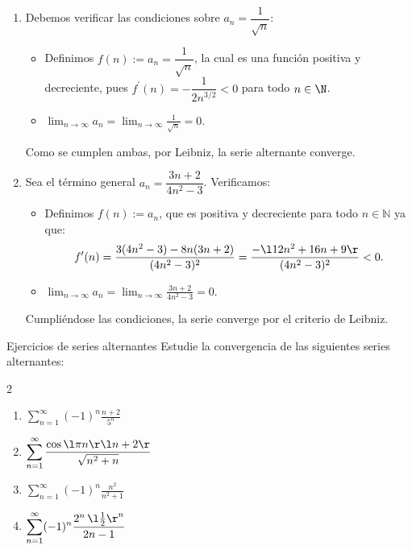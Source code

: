 \begin{soln}
    $\left. \right.$
    \begin{enumerate}
        \item Debemos verificar las condiciones sobre $a_n = \dfrac{1}{\sqrt{n}}$:
        \begin{itemize}
            \item Definimos $f(n) := a_n = \dfrac{1}{\sqrt{n}}$, la cual es una función positiva y decreciente, pues $f^{\prime}(n) = -\dfrac{1}{2n^{3/2}} < 0$ para todo $n \in \N$.
            \item $\displaystyle \lim_{n \to \infty} a_n = \displaystyle \lim_{n \to \infty} \frac{1}{\sqrt{n}} = 0$.
        \end{itemize}
        Como se cumplen ambas, por Leibniz, la serie alternante converge.
        
        \item Sea el término general $a_n = \dfrac{3n+2}{4n^2-3}$. Verificamos:
        \begin{itemize}
            \item Definimos $f(n) := a_n$, que es positiva y decreciente para todo $n\in\mathbb{N}$ ya que:
            \[ f^{\prime}(n) = \dfrac{3 (4n^2 -3) - 8n(3n+2)}{(4n^2-3)^2} = \dfrac{- \l 12n^2+16n+9 \r}{(4n^2-3)^2} < 0. \]
            \item $\displaystyle \lim_{n \to \infty} a_n = \displaystyle \lim_{n \to \infty} \frac{3n+2}{4n^2-3} = 0$.
        \end{itemize}
        Cumpliéndose las condiciones, la serie converge por el criterio de Leibniz.
    \end{enumerate}
\end{soln}

\begin{problem}{Ejercicios de series alternantes}{}
    Estudie la convergencia de las siguientes series alternantes:
    \begin{multicols}{2}
        \begin{enumerate}
            \item $\displaystyle \sum_{n=1}^{\infty}(-1)^{n}\frac{n+2}{5^n}$
            \item $\displaystyle \sum_{n=1}^{\infty}\frac{\cos{\l \pi n \r} \l n+2 \r}{\sqrt{n^2 +n}}$
            \item $\displaystyle \sum_{n=1}^{\infty}(-1)^{n} \frac{n^2}{n^2+1}$
            \item $\displaystyle \sum_{n=1}^{\infty}(-1)^{n} \frac{2^n \, \l \frac{1}{2} \r^n}{2n-1}$
        \end{enumerate}
    \end{multicols}
\end{problem}

